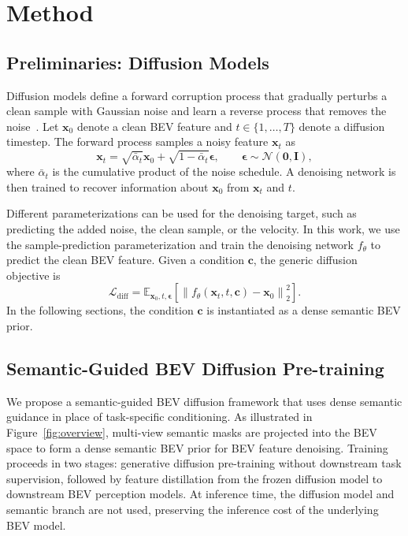 \documentclass{article} %
\begin{document}
\section{Method}
\subsection{Preliminaries: Diffusion Models}
Diffusion models define a forward corruption process that gradually perturbs a
clean sample with Gaussian noise and learn a reverse process that removes the
noise~\citep{DDPM,DDIM}. Let $\mathbf{x}_0$ denote a clean BEV feature and
$t \in \{1,\dots,T\}$ denote a diffusion timestep. The forward process samples a
noisy feature $\mathbf{x}_t$ as
\begin{equation}
\label{eq:forward-diffusion}
  \mathbf{x}_t =
  \sqrt{\bar{\alpha}_t}\mathbf{x}_0 +
  \sqrt{1-\bar{\alpha}_t}\boldsymbol{\epsilon},
  \qquad
  \boldsymbol{\epsilon} \sim \mathcal{N}(\mathbf{0}, \mathbf{I}),
\end{equation}
where $\bar{\alpha}_t$ is the cumulative product of the noise schedule. A
denoising network is then trained to recover information about
$\mathbf{x}_0$ from $\mathbf{x}_t$ and $t$.

Different parameterizations can be used for the denoising target, such as
predicting the added noise, the clean sample, or the velocity. In this work, we
use the sample-prediction parameterization and train the denoising network
$f_{\theta}$ to predict the clean BEV feature. Given a condition $\mathbf{c}$,
the generic diffusion objective is
\begin{equation}
\label{eq:diffusion-objective}
  \mathcal{L}_{\mathrm{diff}} =
  \mathbb{E}_{\mathbf{x}_0,t,\boldsymbol{\epsilon}}
  \left[
  \left\|f_{\theta}(\mathbf{x}_t,t,\mathbf{c}) - \mathbf{x}_0\right\|_2^2
  \right].
\end{equation}
In the following sections, the condition $\mathbf{c}$ is instantiated as a
dense semantic BEV prior.



\subsection{Semantic-Guided BEV Diffusion Pre-training}

We propose a semantic-guided BEV diffusion framework that uses dense semantic
guidance in place of task-specific conditioning. As illustrated in
Figure~\ref{fig:overview}, multi-view semantic masks are projected into the BEV
space to form a dense semantic BEV prior for BEV feature denoising. Training
proceeds in two stages: generative diffusion pre-training without downstream
task supervision, followed by feature distillation from the frozen diffusion
model to downstream BEV perception models. At inference time, the diffusion
model and semantic branch are not used, preserving the inference cost of the
underlying BEV model.
\end{document}
